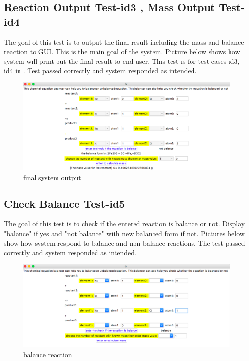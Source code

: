 \documentclass[12pt, titlepage]{article}
\begin{document}
\subsection{Reaction Output Test-id3 , Mass Output Test-id4}

The goal of this test is to output the final result including the mass and balance reaction to GUI. This is the main goal of the system. Picture below shows how system will print out the final result to end user. This test is for test cases  id3, id4 in \cite{SystemVnVPlan}. Test passed correctly and system responded as intended.

\begin{figure}[h!]
 \begin{center}
 \includegraphics [width=\textwidth]{output}
 \caption{\label{ Figure 5:} final system output}
 \end{center}
 \end{figure}

\subsection{Check Balance Test-id5}

The goal of this test is to check if the entered reaction is balance or not. Display "balance" if yes and "not balance" with new balanced form if not. Pictures below show how system respond to balance and non balance reactions. The test passed correctly and system responded as intended.

\begin{figure}[H]
 \begin{center}
 \includegraphics [width=\textwidth]{balance}
 \caption{\label{ Figure 6:} balance reaction}
 \end{center}
 \end{figure}
 
\end{document}
